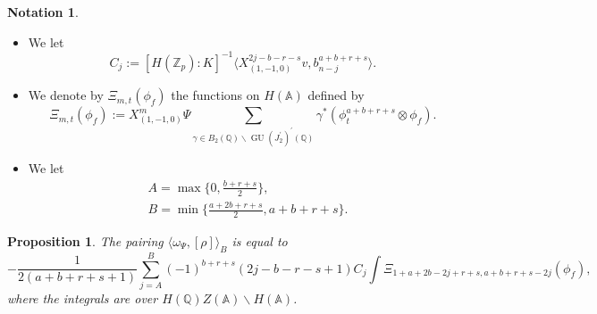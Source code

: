 \documentclass[11pt, a4paper]{amsart}
\theoremstyle{plain}
\newtheorem{proposition}[theorem]{Proposition}
\theoremstyle{definition}
\newtheorem{notation}[theorem]{Notation}
\numberwithin{equation}{section}
\def\AAA{\mathbb{A}}
\def\QQ{\mathbb{Q}}
\def\ZZ{\mathbb{Z}}
\DeclareMathOperator{\GU}{GU}
\newcommand{\Zp}{\ZZ_p}
\begin{document}
\begin{notation}
\label{notation: Xi}
    \begin{itemize}
        \item   We let 
                \begin{equation*}
                    C_{j} := [H(\Zp): K]^{-1} \langle X^{2j -b -r -s}_{(1, -1, 0)}v , b^{a + b + r + s}_{n - j} \rangle. 
                \end{equation*}
        \item  We denote by $\Xi_{m, t}(\phi_f)$ the functions on $H(\AAA)$ defined by 
                \begin{equation*}
                    \Xi_{m, t}(\phi_f) := X^{m}_{(1, -1, 0)} \Psi \sum\limits_{\gamma \in B_{2}(\QQ) \backslash \GU(J_{2}^{'})^{'}(\QQ)} \gamma^{*} (\phi_{t}^{a + b + r + s} \otimes \phi_{f}). 
                \end{equation*}
        \item We let 
             \begin{align*}
                & A = \max \{0, \frac{b + r + s}{2} \}, \\
                & B = \min\{ \frac{a + 2b + r + s}{2}, a + b + r + s\}. 
            \end{align*}
    \end{itemize}
\end{notation}

\begin{proposition}
\label{prop: explicit_pairing}
The pairing $\langle \omega_{\Psi},  [\rho] \rangle_{B} $ is equal to 
\begin{equation}
\label{eq:pairing}
    -\frac{1}{2(a + b + r + s + 1)} \sum\limits_{j = A}^{B} (-1)^{b + r + s} (2j - b -r - s + 1) C_j\int \Xi_{1 + a + 2b -2j + r + s, a + b + r + s - 2j}(\phi_f),
\end{equation}
where the integrals are over $H(\QQ) Z(\AAA) \backslash H(\AAA)$. 
\end{proposition}
\end{document}
